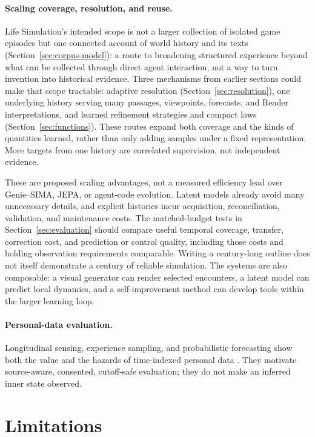 \documentclass[10pt]{article}
\begin{document}
\paragraph{Scaling coverage, resolution, and reuse.}
Life Simulation's intended scope is not a larger collection of isolated game
episodes but one connected account of world history and its texts
(Section~\ref{sec:corpus-model}): a route to broadening structured experience beyond
what can be collected through direct agent interaction, not a way to turn invention
into historical evidence. Three mechanisms from earlier sections could make that
scope tractable: adaptive resolution (Section~\ref{sec:resolution}), one underlying
history serving many passages, viewpoints, forecasts, and Reader interpretations, and
learned refinement strategies and compact laws (Section~\ref{sec:functions}). These
routes expand both coverage and the kinds of quantities learned, rather than only
adding samples under a fixed representation. More targets from one history are
correlated supervision, not independent evidence.

These are proposed scaling advantages, not a measured efficiency lead over
Genie--SIMA, JEPA, or agent-code evolution. Latent models already avoid many
unnecessary details, and explicit histories incur acquisition, reconciliation,
validation, and maintenance costs. The matched-budget tests in
Section~\ref{sec:evaluation} should compare useful temporal coverage, transfer,
correction cost, and prediction or control quality, including those costs and
holding observation requirements comparable. Writing a century-long outline
does not itself demonstrate a century of reliable simulation. The systems are
also composable: a visual generator can render selected encounters, a latent
model can predict local dynamics, and a self-improvement method can develop
tools within the larger learning loop.

\paragraph{Personal-data evaluation.}
Longitudinal sensing, experience sampling, and probabilistic forecasting show
both the value and the hazards of time-indexed personal data
\cite{shiffman2008,ponnada2022,burns2011mobilyze,
gneitingRaftery2007,tashman2000}. They motivate source-aware, consented,
cutoff-safe evaluation; they do not make an inferred inner state observed.

\section{Limitations}
\label{sec:limitations}
\end{document}

